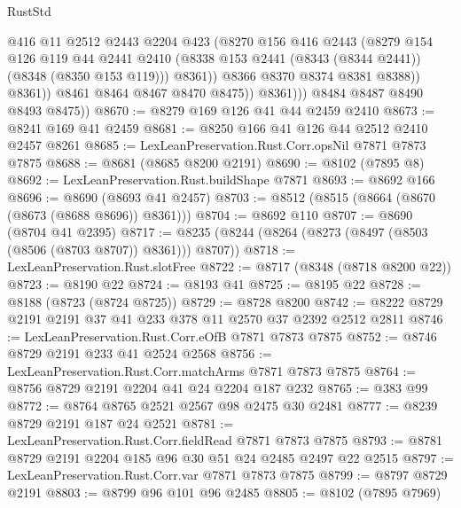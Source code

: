 \begin{lexlean}{RustStd}
\begin{coremodule}
                          @416
                          @11
                          @2512
                          @2443
                          @2204
                          @423
                          (@8270
                            @156
                            @416
                            @2443
                            (@8279
                              @154
                              @126
                              @119
                              @44
                              @2441
                              @2410
                              (@8338 @153 @2441 (@8343 (@8344 @2441)) (@8348 (@8350 @153 @119)))
                              @8361))
                          @8366
                          @8370
                          @8374
                          @8381
                          @8388))
                      @8361))
                  @8461
                  @8464
                  @8467
                  @8470
                  @8475))
              @8361)))
        @8484
        @8487
        @8490
        @8493
        @8475))
@8670 := @8279 @169 @126 @41 @44 @2459 @2410
@8673 := @8241 @169 @41 @2459
@8681 := @8250 @166 @41 @126 @44 @2512 @2410 @2457 @8261
@8685 := LexLeanPreservation.Rust.Corr.opsNil @7871 @7873 @7875
@8688 := @8681 (@8685 @8200 @2191)
@8690 := @8102 (@7895 @8)
@8692 := LexLeanPreservation.Rust.buildShape @7871
@8693 := @8692 @166
@8696 := @8690 (@8693 @41 @2457)
@8703 := @8512 (@8515 (@8664 (@8670 (@8673 (@8688 @8696)) @8361)))
@8704 := @8692 @110
@8707 := @8690 (@8704 @41 @2395)
@8717 := @8235 (@8244 (@8264 (@8273 (@8497 (@8503 (@8506 (@8703 @8707)) @8361))) @8707))
@8718 := LexLeanPreservation.Rust.slotFree
@8722 := @8717 (@8348 (@8718 @8200 @22))
@8723 := @8190 @22
@8724 := @8193 @41
@8725 := @8195 @22
@8728 := @8188 (@8723 (@8724 @8725))
@8729 := @8728 @8200
@8742 := @8222 @8729 @2191 @2191 @37 @41 @233 @378 @11 @2570 @37 @2392 @2512 @2811
@8746 := LexLeanPreservation.Rust.Corr.eOfB @7871 @7873 @7875
@8752 := @8746 @8729 @2191 @233 @41 @2524 @2568
@8756 := LexLeanPreservation.Rust.Corr.matchArms @7871 @7873 @7875
@8764 := @8756 @8729 @2191 @2204 @41 @24 @2204 @187 @232
@8765 := @383 @99
@8772 := @8764 @8765 @2521 @2567 @98 @2475 @30 @2481
@8777 := @8239 @8729 @2191 @187 @24 @2521
@8781 := LexLeanPreservation.Rust.Corr.fieldRead @7871 @7873 @7875
@8793 := @8781 @8729 @2191 @2204 @185 @96 @30 @51 @24 @2485 @2497 @22 @2515
@8797 := LexLeanPreservation.Rust.Corr.var @7871 @7873 @7875
@8799 := @8797 @8729 @2191
@8803 := @8799 @96 @101 @96 @2485
@8805 := @8102 (@7895 @7969)

\end{coremodule}
\end{lexlean}
